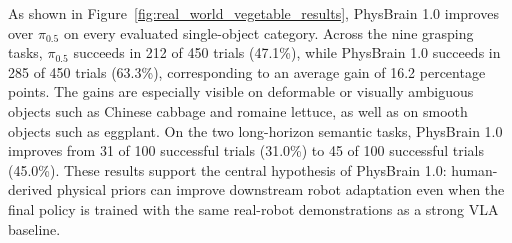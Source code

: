\documentclass{llmxive}
\begin{document}
As shown in Figure~\ref{fig:real_world_vegetable_results}, PhysBrain 1.0 improves over $\pi_{0.5}$ on every evaluated single-object category. Across the nine grasping tasks, $\pi_{0.5}$ succeeds in 212 of 450 trials (47.1\%), while PhysBrain 1.0 succeeds in 285 of 450 trials (63.3\%), corresponding to an average gain of 16.2 percentage points. The gains are especially visible on deformable or visually ambiguous objects such as Chinese cabbage and romaine lettuce, as well as on smooth objects such as eggplant. On the two long-horizon semantic tasks, PhysBrain 1.0 improves from 31 of 100 successful trials (31.0\%) to 45 of 100 successful trials (45.0\%). These results support the central hypothesis of PhysBrain 1.0: human-derived physical priors can improve downstream robot adaptation even when the final policy is trained with the same real-robot demonstrations as a strong VLA baseline.



\end{document}
